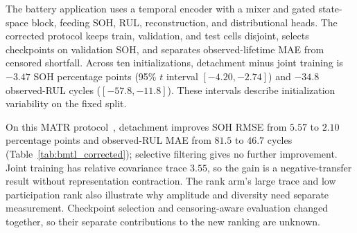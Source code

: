 \documentclass{article}
\begin{document}
\begin{table}[t]
\centering
\caption{Real auxiliary heads at width $64$, ten seeds: mean primary accuracy and collapse rate in parentheses. The listed radial selective arms do not match detachment on high-dose SNR regression. The separate rank-3 arm also avoids collapse in all ten SNR seeds, but reaches only $0.211$ accuracy (Figure~\ref{fig:intervention}c).}
\label{tab:real_aux}
\footnotesize
{}
\end{table}




The battery application uses a temporal encoder with a mixer and gated state-space block, feeding SOH, RUL, reconstruction, and distributional heads. The corrected protocol keeps train, validation, and test cells disjoint, selects checkpoints on validation SOH, and separates observed-lifetime MAE from censored shortfall. Across ten initializations, detachment minus joint training is $-3.47$ SOH percentage points (95\% $t$ interval $[-4.20,-2.74]$) and $-34.8$ observed-RUL cycles ($[-57.8,-11.8]$). These intervals describe initialization variability on the fixed split.

On this MATR protocol~\citep{severson2019data}, detachment improves SOH RMSE from $5.57$ to $2.10$ percentage points and observed-RUL MAE from $81.5$ to $46.7$ cycles (Table~\ref{tab:bmtl_corrected}); selective filtering gives no further improvement. Joint training has relative covariance trace $3.55$, so the gain is a negative-transfer result without representation contraction. The rank arm's large trace and low participation rank also illustrate why amplitude and diversity need separate measurement. Checkpoint selection and censoring-aware evaluation changed together, so their separate contributions to the new ranking are unknown.
\end{document}
